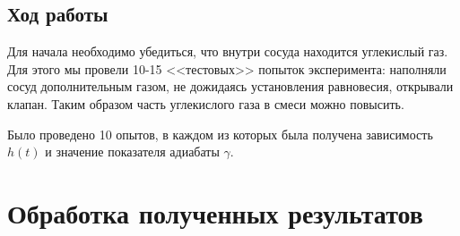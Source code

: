 \documentclass[a4paper,12pt]{report}
\begin{document}
\begin{multicols}{2}
    \section*{Ход работы}
    Для начала необходимо убедиться, что внутри сосуда находится углекислый газ. Для этого мы провели 10-15 <<тестовых>> попыток эксперимента: наполняли сосуд дополнительным газом, не дожидаясь установления равновесия, открывали клапан. Таким образом часть углекислого газа в смеси можно повысить.

    Было проведено 10 опытов, в каждом из которых была получена зависимость $h(t)$ и значение показателя адиабаты $\gamma$.
    \end{multicols}

    \section{Обработка полученных результатов}
\end{document}
